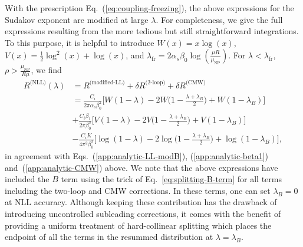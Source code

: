With the prescription Eq.~(\ref{eq:coupling-freezing}), the above
expressions for the Sudakov exponent are modified at large
$\lambda$. For completeness, we give the full expressions resulting
from the more tedious but still straightforward integrations.
To this purpose, it is helpful to introduce $W(x)=x\log(x)$,
$V(x)=\tfrac{1}{2}\log^2(x)+\log(x)$, and
$\lambda_\text{fr}=2\alpha_s\beta_0\log(\tfrac{\mu
  R}{\mu_\text{NP}})$.
%
For $\lambda<\lambda_\text{fr}$, \ie
$\rho>\tfrac{\mu_\text{NP}}{R\mu}$, we find
\begin{align}
  R^\text{(NLL)}(\lambda)
  & = R^\text{(modified-LL)}+\delta R^\text{(2-loop)}+\delta R^\text{(CMW)}\\
  & = \frac{C_i}{2\pi\alpha_s\beta_0^2}\Big[
    W(1-\lambda)-2W\big(1-\frac{\lambda+\lambda_B}{2}\big)+W(1-\lambda_B)
    \Big]\nonumber\\
  & +\frac{C_i\beta_1}{2\pi\beta_0^3}\Big[
    V(1-\lambda)-2V\big(1-\frac{\lambda+\lambda_B}{2}\big)+V(1-\lambda_B)
    \Big]\nonumber\\
  & -\frac{C_iK}{4\pi^2\beta_0^2}\Big[
    \log(1-\lambda)-2\log\big(1-\frac{\lambda+\lambda_B}{2}\big)+\log(1-\lambda_B)
    \Big],\nonumber
\end{align}
in agreement with Eqs.~(\ref{app:analytic-LL-modB}),
(\ref{app:analytic-beta1}) and~(\ref{app:analytic-CMW}) above.
%
We note that the above expressions have included the $B$ term using
the trick of Eq.~\eqref{eq:splitting-B-term} for all terms including
the two-loop and CMW corrections. In these terms, one can set
$\lambda_B=0$ at NLL accuracy. Although keeping these contribution has
the drawback of introducing uncontrolled subleading corrections, it
comes with the benefit of providing a uniform treatment of
hard-collinear splitting which places the endpoint of all the terms in
the resummed distribution at $\lambda=\lambda_B$.

